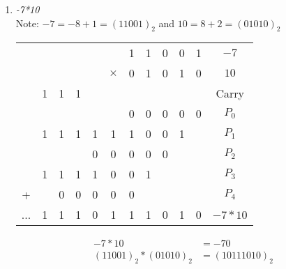 \documentclass[12pt]{article}
\begin{document}
\begin{enumerate}
\begin{enumerate}
          \item \textit{-7*10} \\
            Note: $-7 = -8 + 1 = (11001)_2$ and $10 = 8 + 2 = (01010)_2$
            \begin{center}
              \begin{tabular}{c c c c c c c c c c c | c}
                &&&&&& 1 & 1 & 0 & 0 & 1 & $-7$\\
                &&&&&$\times$ & 0 & 1 & 0 & 1 & 0 & $10$\\
                \hline
                & 1 & 1 & 1 &&&&&&&& Carry \\
                &&&&&& 0 & 0 & 0 & 0 & 0 & $P_0$ \\
                & 1 & 1 & 1 & 1 & 1 & 1 & 0 & 0 & 1 && $P_1$ \\
                &&&& 0 & 0 & 0 & 0 & 0 &&& $P_2$ \\
                & 1 & 1 & 1 & 1 & 0 & 0 & 1 &&&& $P_3$ \\
              + && 0 & 0 & 0 & 0 & 0 &&&&& $P_4$ \\
                \hline
                ... & 1 & 1 & 1 & 0 & 1 & 1 & 1 & 0 & 1 & 0 & $-7*10$
              \end{tabular}
              \begin{align*}
                -7*10 &= -70 \\
                (11001)_2 * (01010)_2 &= \boxed{(10111010)_2}
              \end{align*}
            \end{center}


\end{enumerate}
\end{enumerate}
\end{document}
